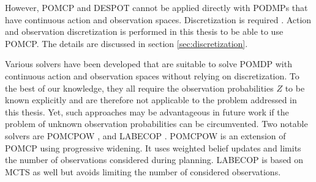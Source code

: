 However, POMCP and DESPOT cannot be applied directly with PODMPs that have continuous action and observation spaces. Discretization is required \parencite{pomcp_continuous}. Action and observation discretization is performed in this thesis to be able to use POMCP. The details are discussed in section \ref{sec:discretization}.

Various solvers have been developed that are suitable to solve POMDP with continuous action and observation spaces without relying on discretization. To the best of our knowledge, they all require the observation probabilities $Z$ to be known explicitly and are therefore not applicable to the problem addressed in this thesis. Yet, such approaches may be advantageous in future work if the problem of unknown observation probabilities can be circumvented. Two notable solvers are POMCPOW \parencite{online_pomdp_cont}, and LABECOP \parencite{online-cont-pomdp-2}. POMCPOW is an extension of POMCP using progressive widening. It uses weighted belief updates and limits the number of observations considered during planning. LABECOP is based on MCTS as well but avoids limiting the number of considered observations.